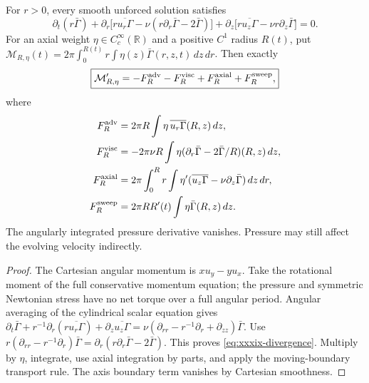 \begin{theorem}
\label{thm:xxxix-cylinder}
For $r>0$, every smooth unforced solution satisfies
\begin{equation}\label{eq:xxxix-divergence}
\boxed{
\partial_t(r\bar\Gamma)
+\partial_r\bigl[r\overline{u_r\Gamma}
-\nu(r\partial_r\bar\Gamma-2\bar\Gamma)\bigr]
+\partial_z\bigl[r\overline{u_z\Gamma}
-\nu r\partial_z\bar\Gamma\bigr]=0.
}
\end{equation}
For an axial weight $\eta\in C_c^\infty(\mathbb R)$
and a positive $C^1$ radius $R(t)$, put
$\mathcal M_{R,\eta}(t)=
2\pi\int_0^{R(t)}r\int\eta(z)\bar\Gamma(r,z,t)\,dz\,dr$.
Then exactly
\begin{equation}\label{eq:xxxix-cylinder-balance}
\boxed{
\mathcal M'_{R,\eta}
=-F_R^{\rm adv}-F_R^{\rm visc}
 +F_R^{\rm axial}+F_R^{\rm sweep},
}
\end{equation}
where
\begin{align*}
F_R^{\rm adv}
 &=2\pi R\int\eta\,\overline{u_r\Gamma}(R,z)\,dz,\\
F_R^{\rm visc}
 &=-2\pi\nu R\int\eta
 (\partial_r\bar\Gamma-2\bar\Gamma/R)(R,z)\,dz,\\
F_R^{\rm axial}
 &=2\pi\int_0^Rr\int\eta'
  (\overline{u_z\Gamma}-\nu\partial_z\bar\Gamma)
 \,dz\,dr,\\
F_R^{\rm sweep}
 &=2\pi RR'(t)\int\eta\bar\Gamma(R,z)\,dz.
\end{align*}
The angularly integrated pressure derivative vanishes.
Pressure may still affect the evolving velocity indirectly.
\end{theorem}
\begin{proof}
The Cartesian angular momentum is $xu_y-yu_x$.
Take the rotational moment of the full conservative
momentum equation; the pressure and symmetric Newtonian
stress have no net torque over a full angular period.
Angular averaging of the cylindrical scalar equation gives
$\partial_t\bar\Gamma+
r^{-1}\partial_r(r\overline{u_r\Gamma})
+\partial_z\overline{u_z\Gamma}
=\nu(\partial_{rr}-r^{-1}\partial_r+\partial_{zz})
\bar\Gamma$.
Use
$r(\partial_{rr}-r^{-1}\partial_r)\bar\Gamma
=\partial_r(r\partial_r\bar\Gamma-2\bar\Gamma)$.
This proves \eqref{eq:xxxix-divergence}.
Multiply by $\eta$, integrate, use axial integration
by parts, and apply the moving-boundary transport rule.
The axis boundary term vanishes by Cartesian smoothness.
\end{proof}

